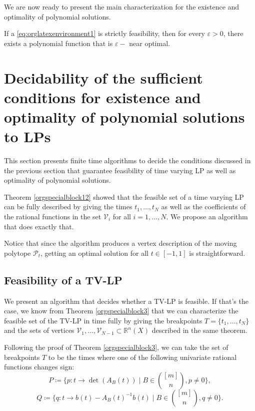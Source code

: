 \documentclass[moor]{informs1}
\begin{document}
We are now ready to present the main characterization for the existence and optimality of polynomial solutions.

\begin{thm}
If a \ref{eq:orglatexenvironment1} is strictly feasibility, then for every \(\varepsilon > 0\), there exists a polynomial function that is \(\varepsilon-\) near optimal.
\label{orgspecialblock7}

\end{thm}
\newpage




\section{Decidability of the sufficient conditions for existence and optimality of polynomial solutions to LPs}
\label{sec:orgheadline15}
\label{orgtarget3}
  This section presents finite time algorithms to decide the conditions discussed in the previous section that guarantee feasibility of time varying LP as well as optimality of polynomial solutions.

Theorem \ref{orgspecialblock12} showed that the feasible set of a time varying LP can be fully described by giving the times \(t_1, \ldots, t_N\) as well as the coefficients of the rational functions in the set \(\mathcal V_i\) for all \(i=1, \ldots, N\). We propose an algorithm that does exactly that.

Notice that since the algorithm produces a vertex description of the moving polytope \(\mathcal P_t\), getting an optimal solution for all \(t \in [-1, 1]\) is straightforward.


\subsection{Feasibility of a TV-LP}
\label{sec:orgheadline11}

We present an algorithm that decides whether a TV-LP is feasible. If that's the case, we know from Theorem \ref{orgspecialblock3} that we can characterize the feasible set of the TV-LP in time fully by giving the breakpoints \(T = \{t_1, \ldots, t_N\}\) and the sets of vertices \(\mathcal V_1, \ldots, \mathcal V_{N-1} \subset \mathbb R^n(X)\) described in the same theorem.

Following the proof of Theorem \ref{orgspecialblock3}, we can take the set of breakpoints \(T\) to be the times where one of the following univariate rational functions changes sign:
$$P \coloneqq \{p: t \rightarrow \det(A_B(t))\;| \; B \in {[m]\choose n}, p \ne 0\},$$
$$Q \coloneqq \{q: t \rightarrow b(t) - A_B(t)^{-1}b(t) \;| \; B \in {[m]\choose n}, q \ne 0\}.$$
\end{document}
